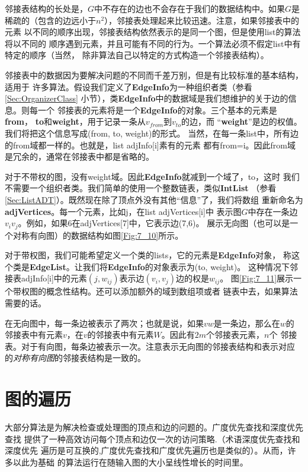 邻接表结构的长处是，$G$中不存在的边也不会存在于我们的数据结构中。如果$G$是
稀疏的（包含的边远小于$n^2$），邻接表处理起来比较迅速。注意，如果邻接表中的元素
以不同的顺序出现，邻接表结构依然表示的是同一个图，但是使用list的算法将以不同的
顺序遇到元素，并且可能有不同的行为。一个算法必须不假定list中有特定的顺序（当然，
除非算法自己以特定的方式构造一个邻接表结构）。

邻接表中的数据因为要解决问题的不同而千差万别，但是有比较标准的基本结构，适用于
许多算法。假设我们定义了{\textbf{EdgeInfo}}为一种组织者类（参看\ref{Sec:OrganizerClass}
小节），类{\textbf{EdgeInfo}}中的数据域是我们想维护的关于边的信息。则每一个
邻接表的元素将是一个{\textbf{EdgeInfo}}的对象。三个基本的元素是{\textbf{from}}，
{\textbf{to}}和{\textbf{weight}}，用于记录一条从$v_{from}$到$v_{to}$的边，而
“{\textbf{weight}}”是边的权值。我们将把这个信息写成(from, to, weight)的形式。
当然，在每一条list中，所有边的from域都一样的。也就是，list adjInfo[i]素有的元素
都有from=i。因此from域是冗余的，通常在邻接表中都是省略的。

对于不带权的图，没有weight域。因此{\textbf{EdgeInfo}}就减到一个域了，to，这时
我们不需要一个组织者类。我们简单的使用一个整数链表，类似{\textbf{IntList}}
（参看\ref{Sec:ListADT}）。既然现在除了顶点外没有其他“信息”了，我们将数组
重新命名为{\textbf{adjVertices}}。每一个元素，比如j，在list adjVertices[i]中
表示图$G$中存在一条边$v_iv_j$。例如，如果6在adjVertices[7]中，它表示边(7,6)。
展示无向图（也可以是一个对称有向图）的数据结构如图\ref{Fig:7_10}所示。

对于带权图，我们可能希望定义一个类的lists，它的元素是{\textbf{EdgeInfo}}对象，
称这个类是{\textbf{EdgeList}}。让我们将{\textbf{EdgeInfo}}的对象表示为(to, weight)。
这种情况下邻接表adjInfo[i]中的元素$(j, w_{ij})$表示边$(v_i, v_j)$边的权是$w_{ij}$。
图\ref{Fig:7_11}展示一个带权图的概念性结构。还可以添加额外的域到数组项或者
链表中去，如果算法需要的话。

在无向图中，每一条边被表示了两次；也就是说，如果$vw$是一条边，那么在$w$的
邻接表中有元素$v$，在$v$的邻接表中有元素$W$。因此有$2m$个邻接表元素，$n$个
邻接表。对于有向图，每条边被表示一次。注意表示无向图的邻接表结构和表示对应
的\emph{对称有向图}的邻接表结构是一致的。

\section{图的遍历}
大部分算法是为解决检查或处理图的顶点和边的问题的。广度优先查找和深度优先查找
提供了一种高效访问每个顶点和边仅一次的访问策略.（术语深度优先查找和深度优先
遍历是可互换的,广度优先查找和广度优先遍历也是类似的）。从而，许多以此为基础
的算法运行在随输入图的大小呈线性增长的时间里。

